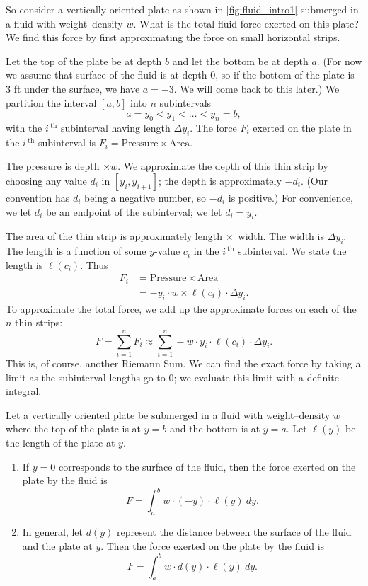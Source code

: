 
So consider a vertically oriented plate as shown in \autoref{fig:fluid_intro1} submerged in a fluid with weight--density $w$. What is the total fluid force exerted on this plate? We find this force by first approximating the force on small horizontal strips.

Let the top of the plate be at depth $b$ and let the bottom be at depth $a$. (For now we assume that surface of the fluid is at depth 0, so if the bottom of the plate is 3 ft under the surface, we have $a=-3$. We will come back to this later.) We partition the interval $[a,b]$ into $n$ subintervals 
$$a=y_0<y_1<\dotso<y_n=b,$$
with the $i\,^\text{th}$ subinterval having length $\Delta y_i$. The force $F_i$ exerted on the plate in the $i\,^\text{th}$ subinterval is $F_i = \text{Pressure}\times \text{Area}.$

The pressure is depth $\times w$. We approximate the depth of this thin strip by choosing any value $d_i$ in $[y_i,y_{i+1}]$; the depth is approximately $-d_i$. (Our convention has $d_i$ being a negative number, so $-d_i$ is positive.) For convenience, we let $d_i$ be an endpoint of the subinterval; we let $d_i = y_i$. 

The area of the thin strip is approximately length $\times$\ width. The width is $\Delta y_i$. The length is a function of some $y$-value $c_i$ in the $i\,^\text{th}$ subinterval. We state the length is $\ell(c_i)$. Thus 
\begin{align*}
	F_i	&= \text{Pressure} \times \text{Area} \\
		&=	-y_i\cdot w \times \ell(c_i)\cdot\Delta y_i.
\end{align*}
To approximate the total force, we add up the approximate forces on each of the $n$ thin strips:
$$F = \sum_{i=1}^n F_i \approx \sum_{i=1}^n -w\cdot y_i\cdot\ell(c_i)\cdot\Delta y_i.$$
This is, of course, another Riemann Sum. We can find the exact force by taking a limit as the subinterval lengths go to 0; we evaluate this limit with a definite integral.

{Let a vertically oriented plate be submerged in a fluid with weight--density $w$ where the top of the plate is at $y=b$ and the bottom is at $y=a$. Let $\ell(y)$ be the length of the plate at $y$.
\begin{enumerate}
	\item	If $y=0$ corresponds to the surface of the fluid, then the force exerted on the plate by the fluid is $$F=\int_a^b w\cdot(-y)\cdot\ell(y)\ dy.$$
	\item	In general, let $d(y)$ represent the distance between the surface of the fluid and the plate at $y$. Then the force exerted on the plate by the fluid is 
	$$F=\int_a^b w\cdot d(y)\cdot\ell(y)\ dy.$$
\end{enumerate}}

